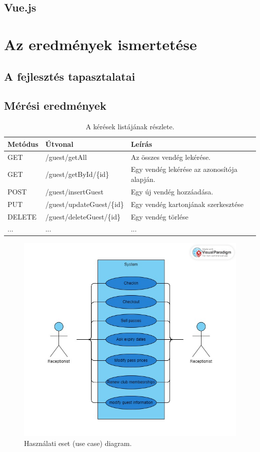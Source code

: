\documentclass[12pt]{article}
\begin{document}
\subsection{Vue.js}

\section{Az eredmények ismertetése}
\subsection{A fejlesztés tapasztalatai}
\subsection{Mérési eredmények}

\begin{table}[h!]
\centering
\begin{tabular}{ |p{1.7cm}|p{4.4cm}|p{6.3cm}| } 
\hline
 \textbf{Metódus} & \textbf{Útvonal} &\textbf{Leírás}\\
\hline
GET & /guest/getAll& Az összes vendég lekérése.\\
\hline
GET & /guest/getById/\{id\}& Egy vendég lekérése az azonosítója alapján.\\
\hline
POST & /guest/insertGuest&  Egy új vendég hozzáadása. \\
\hline
PUT & /guest/updateGuest/\{id\} & Egy vendég kartonjának szerkesztése \\
\hline
DELETE & /guest/deleteGuest/\{id\} & Egy vendég törlése  \\
\hline
... & ... &...  \\
\hline
\end{tabular}
\caption{A kérések listájának részlete.}
\end{table}

\begin{figure}
\includegraphics[width=\textwidth]{usecase}
\caption{Használati eset (use case) diagram. }
\end{figure}
\end{document}
